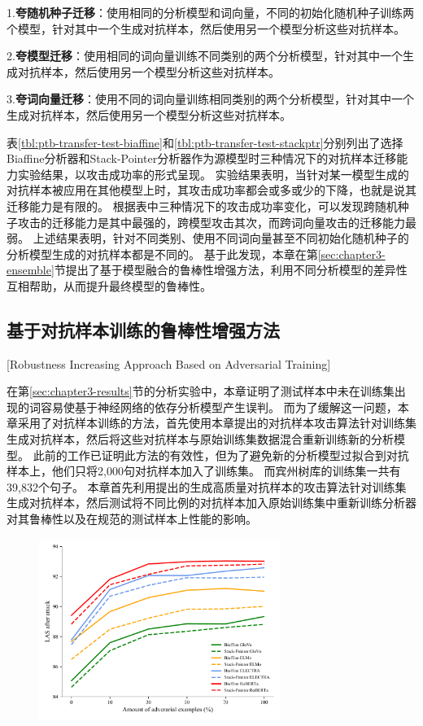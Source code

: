 1.\textbf{夸随机种子迁移}：使用相同的分析模型和词向量，不同的初始化随机种子训练两个模型，针对其中一个生成对抗样本，然后使用另一个模型分析这些对抗样本。

2.\textbf{夸模型迁移}：使用相同的词向量训练不同类别的两个分析模型，针对其中一个生成对抗样本，然后使用另一个模型分析这些对抗样本。

3.\textbf{夸词向量迁移}：使用不同的词向量训练相同类别的两个分析模型，针对其中一个生成对抗样本，然后使用另一个模型分析这些对抗样本。

表\ref{tbl:ptb-transfer-test-biaffine}和\ref{tbl:ptb-transfer-test-stackptr}分别列出了选择Biaffine分析器和Stack-Pointer分析器作为源模型时三种情况下的对抗样本迁移能力实验结果，以攻击成功率的形式呈现。
实验结果表明，当针对某一模型生成的对抗样本被应用在其他模型上时，其攻击成功率都会或多或少的下降，也就是说其迁移能力是有限的。
根据表中三种情况下的攻击成功率变化，可以发现跨随机种子攻击的迁移能力是其中最强的，跨模型攻击其次，而跨词向量攻击的迁移能力最弱。
上述结果表明，针对不同类别、使用不同词向量甚至不同初始化随机种子的分析模型生成的对抗样本都是不同的。
基于此发现，本章在第\ref{sec:chapter3-ensemble}节提出了基于模型融合的鲁棒性增强方法，利用不同分析模型的差异性互相帮助，从而提升最终模型的鲁棒性。


\subsection{基于对抗样本训练的鲁棒性增强方法}[Robustness Increasing Approach Based on Adversarial Training]
\label{sec:chapter3-adv-training}

在第\ref{sec:chapter3-results}节的分析实验中，本章证明了测试样本中未在训练集出现的词容易使基于神经网络的依存分析模型产生误判。
而为了缓解这一问题，本章采用了对抗样本训练的方法，首先使用本章提出的对抗样本攻击算法针对训练集生成对抗样本，然后将这些对抗样本与原始训练集数据混合重新训练新的分析模型。
此前的工作\cite{han-etal-2020-adversarial}已证明此方法的有效性，但为了避免新的分析模型过拟合到对抗样本上，他们只将2,000句对抗样本加入了训练集。
而宾州树库的训练集一共有39,832个句子。
本章首先利用提出的生成高质量对抗样本的攻击算法针对训练集生成对抗样本，然后测试将不同比例的对抗样本加入原始训练集中重新训练分析器对其鲁棒性以及在规范的测试样本上性能的影响。

\begin{figure}[hbtp]
	\centering
	\includegraphics[width=0.7\textwidth]{figures/adv_training_after_attack.pdf}
\end{figure}

